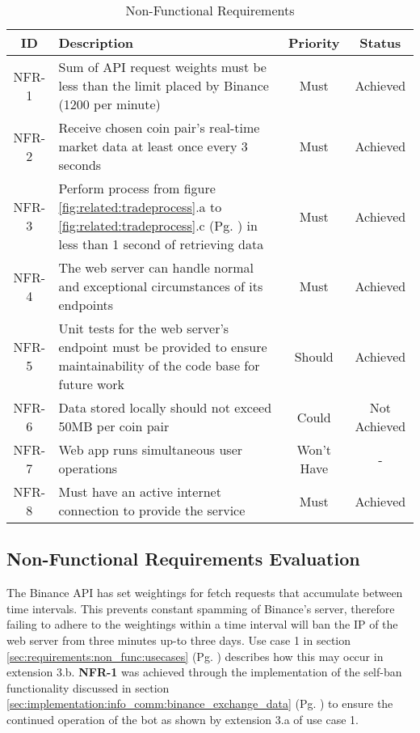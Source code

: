 \begin{table}[htb!]
\caption{Non-Functional Requirements}
\label{table:requirements:non_func}
\centering
\begin{tabularx}{\linewidth}{|c|L|c|c|}
\hline
\textbf{ID} & \textbf{Description} & \textbf{Priority} & \textbf{Status} \\ \hline\hline
%
NFR-1 
& Sum of API request weights must be less than the limit placed by Binance (1200 per minute) 
& Must 
& Achieved \\ 
\hline
%
NFR-2 
& Receive chosen coin pair's real-time market data at least once every 3 seconds 
& Must 
& Achieved\\ \hline
%
NFR-3 
& Perform process from figure \ref{fig:related:tradeprocess}.a to \ref{fig:related:tradeprocess}.c (Pg. \pageref{fig:related:tradeprocess}) in less than 1 second of retrieving data 
& Must 
& Achieved \\ \hline
%
NFR-4 
& The web server can handle normal and exceptional circumstances of its endpoints 
& Must 
& Achieved \\\hline
%
NFR-5 
& Unit tests for the web server's endpoint must be provided to ensure maintainability of the code base for future work 
& Should 
& Achieved \\\hline
%
NFR-6 
& Data stored locally should not exceed 50MB per coin pair 
& Could 
& Not Achieved \\ \hline
%
NFR-7 
& Web app runs simultaneous user operations 
& Won't Have
& -
\\\hline
%
NFR-8 
& Must have an active internet connection to provide the service 
& Must 
& Achieved \\\hline
\end{tabularx}
\end{table}

\subsection{Non-Functional Requirements Evaluation}
\label{sec:requirements:non_func:eval}

\noindent The Binance API \cite{WEB:BINANCE_API:2018} has set weightings for fetch requests that accumulate between time intervals. This prevents constant spamming of Binance's server, therefore failing to adhere to the weightings within a time interval will ban the IP of the web server from three minutes up-to three days. Use case 1 in section \ref{sec:requirements:non_func:usecases} (Pg. \pageref{sec:requirements:non_func:usecases:1}) describes how this may occur in extension 3.b. \textbf{NFR-1} was achieved through the implementation of the self-ban functionality discussed in section \ref{sec:implementation:info_comm:binance_exchange_data} (Pg. \pageref{sec:implementation:info_comm:binance_exchange_data}) to ensure the continued operation of the bot as shown by extension 3.a of use case 1.
    
